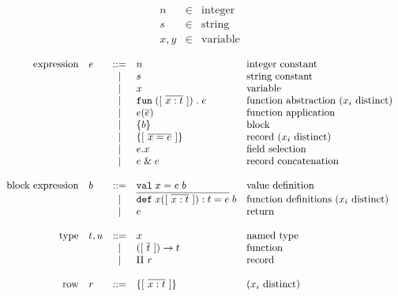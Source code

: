\documentclass[11pt]{article}
\begin{document}
\[
\begin{array}{lcl}
n & \in & \text{integer} \\
s & \in & \text{string} \\
x, y & \in & \text{variable} \\
\end{array}
\]
\[
\begin{array}{rlcll}
\text{expression}
  & e & ::= & n                      & \text{integer constant} \\
  &   & |   & s                      & \text{string constant} \\
  &   & |   & x                      & \text{variable} \\
  &   & |   & \mathtt{fun}\;([\ \overline{x : t}\ ])\;.\;e   & \text{function abstraction ($x_i$ distinct)} \\
  &   & |   & e(\overline{e})             & \text{function application} \\
  &   & |   & \{ b \}                      & \text{block} \\
  &   & |   & \{ [\ \overline{x = e}\ ] \}                   & \text{record ($x_i$ distinct)} \\
  &   & |   & e . x                   & \text{field selection} \\
  &   & |   & e\;\&\;e                   & \text{record concatenation} \\
\\
\text{block expression}
  & b & ::= & \mathtt{val}\;x = e\;b                 & \text{value definition} \\
  &   & |   & \overline{\mathtt{def}\;x([\ \overline{x : t}\ ]) : t = e}\;b   & \text{function definitions ($x_i$ distinct)} \\
  &   & |   & e                       & \text{return} \\
\\
\text{type}
  & t, u & ::=  & x             & \text{named type} \\
  &      & |   & ([\ \overline{t}\ ]) -> t & \text{function} \\
  &      & |   & \Pi\ r          & \text{record} \\
\\
\text{row}
  & r & ::= & \{ [\ \overline{x : t}\ ] \}       & \text{($x_i$ distinct)}
\end{array}
\]
\end{document}
